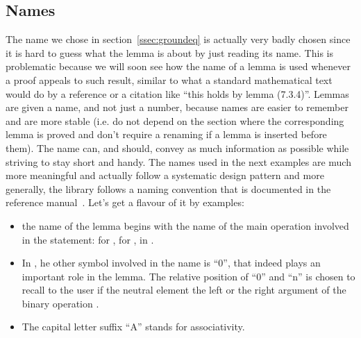 \subsection{Names}
 The name  we chose in
section~\ref{ssec:groundeq} is actually very badly chosen since it is
hard to guess what the lemma is about by just reading its name.
This is problematic because we will soon see how the name of a lemma
is used whenever a proof appeals to such result,
similar to what a standard mathematical text would do by a reference or
a citation like ``this holds by lemma (7.3.4)''.  Lemmas are given a name,
and not just a number, because names are easier to remember and are more
stable (i.e. do not depend on the section where the corresponding lemma
is proved and don't require a renaming if a lemma is inserted before them).
The name can, and should, convey as much information as possible while
striving to stay short and handy. The
names used in the next examples are much more meaningful and actually
follow a systematic design pattern and more generally, the \mcbMC{}
library follows a naming convention that is documented in the
reference manual~\cite{ssrman}. Let's get a flavour of it by examples:

\begin{itemize}
\item the name of the lemma begins with the name of the main operation
  involved in the statement:  for ,  for
  ,  in .
\item In , he other symbol involved in the name is ``0'',
that indeed plays an important role in the lemma.  The relative position
of ``0'' and ``n'' is chosen to recall to the user if the neutral element
 the left or the right argument of the binary operation .
\item The capital letter suffix ``A'' stands for associativity.
\end{itemize}



